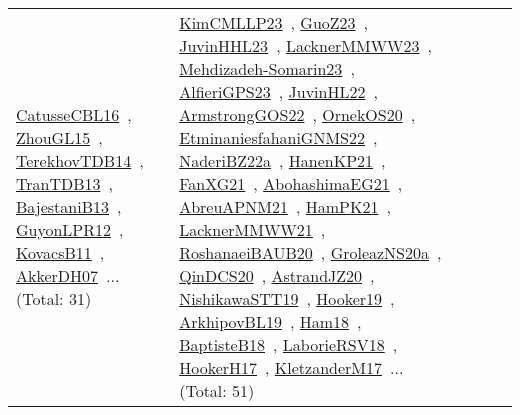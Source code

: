 {\begin{longtable}{lp{3cm}>{\raggedright\arraybackslash}p{6cm}>{\raggedright\arraybackslash}p{6cm}>{\raggedright\arraybackslash}p{8cm}}
\href{../works/CatusseCBL16.pdf}{CatusseCBL16}~\cite{CatusseCBL16}, \href{../works/ZhouGL15.pdf}{ZhouGL15}~\cite{ZhouGL15}, \href{../works/TerekhovTDB14.pdf}{TerekhovTDB14}~\cite{TerekhovTDB14}, \href{../works/TranTDB13.pdf}{TranTDB13}~\cite{TranTDB13}, \href{../works/BajestaniB13.pdf}{BajestaniB13}~\cite{BajestaniB13}, \href{../works/GuyonLPR12.pdf}{GuyonLPR12}~\cite{GuyonLPR12}, \href{../works/KovacsB11.pdf}{KovacsB11}~\cite{KovacsB11}, \href{../works/AkkerDH07.pdf}{AkkerDH07}~\cite{AkkerDH07}... (Total: 31) & \href{../works/KimCMLLP23.pdf}{KimCMLLP23}~\cite{KimCMLLP23}, \href{../works/GuoZ23.pdf}{GuoZ23}~\cite{GuoZ23}, \href{../works/JuvinHHL23.pdf}{JuvinHHL23}~\cite{JuvinHHL23}, \href{../works/LacknerMMWW23.pdf}{LacknerMMWW23}~\cite{LacknerMMWW23}, \href{../works/Mehdizadeh-Somarin23.pdf}{Mehdizadeh-Somarin23}~\cite{Mehdizadeh-Somarin23}, \href{../works/AlfieriGPS23.pdf}{AlfieriGPS23}~\cite{AlfieriGPS23}, \href{../works/JuvinHL22.pdf}{JuvinHL22}~\cite{JuvinHL22}, \href{../works/ArmstrongGOS22.pdf}{ArmstrongGOS22}~\cite{ArmstrongGOS22}, \href{../works/OrnekOS20.pdf}{OrnekOS20}~\cite{OrnekOS20}, \href{../works/EtminaniesfahaniGNMS22.pdf}{EtminaniesfahaniGNMS22}~\cite{EtminaniesfahaniGNMS22}, \href{../works/NaderiBZ22a.pdf}{NaderiBZ22a}~\cite{NaderiBZ22a}, \href{../works/HanenKP21.pdf}{HanenKP21}~\cite{HanenKP21}, \href{../works/FanXG21.pdf}{FanXG21}~\cite{FanXG21}, \href{../works/AbohashimaEG21.pdf}{AbohashimaEG21}~\cite{AbohashimaEG21}, \href{../works/AbreuAPNM21.pdf}{AbreuAPNM21}~\cite{AbreuAPNM21}, \href{../works/HamPK21.pdf}{HamPK21}~\cite{HamPK21}, \href{../works/LacknerMMWW21.pdf}{LacknerMMWW21}~\cite{LacknerMMWW21}, \href{../works/RoshanaeiBAUB20.pdf}{RoshanaeiBAUB20}~\cite{RoshanaeiBAUB20}, \href{../works/GroleazNS20a.pdf}{GroleazNS20a}~\cite{GroleazNS20a}, \href{../works/QinDCS20.pdf}{QinDCS20}~\cite{QinDCS20}, \href{../works/AstrandJZ20.pdf}{AstrandJZ20}~\cite{AstrandJZ20}, \href{../works/NishikawaSTT19.pdf}{NishikawaSTT19}~\cite{NishikawaSTT19}, \href{../works/Hooker19.pdf}{Hooker19}~\cite{Hooker19}, \href{../works/ArkhipovBL19.pdf}{ArkhipovBL19}~\cite{ArkhipovBL19}, \href{../works/Ham18.pdf}{Ham18}~\cite{Ham18}, \href{../works/BaptisteB18.pdf}{BaptisteB18}~\cite{BaptisteB18}, \href{../works/LaborieRSV18.pdf}{LaborieRSV18}~\cite{LaborieRSV18}, \href{../works/HookerH17.pdf}{HookerH17}~\cite{HookerH17}, \href{../works/KletzanderM17.pdf}{KletzanderM17}~\cite{KletzanderM17}... (Total: 51)\\

\end{longtable}}
